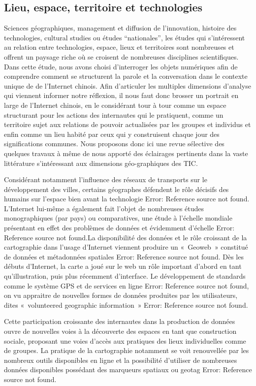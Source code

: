\subsection[Lieu, espace, territoire et technologies]{ Lieu, espace, territoire et technologies}
Sciences géographiques, management et diffusion de l’innovation, histoire des technologies, cultural studies ou études “nationales”, les études qui s’intéressent au relation entre technologies, espace, lieux et territoires sont nombreuses et offrent un paysage riche où se croisent de nombreuses disciplines scientifiques. Dans cette étude, nous avons choisi d’interroger les objets numériques afin de comprendre comment se structurent la parole et la conversation dans le contexte unique de de l’Internet chinois. Afin d’articuler les multiples dimensions d’analyse qui viennent informer notre réflexion, il nous faut donc brosser un portrait en large de l’Internet chinois, en le considérant tour à tour comme un espace structurant pour les actions des internautes qui le pratiquent, comme un territoire sujet aux relations de pouvoir actualisées par les groupes et individus et enfin comme un lieu habité par ceux qui y construisent chaque jour des significations communes. Nous proposons donc ici une revue sélective des quelques travaux à même de nous apporté des éclairages pertinents dans la vaste littérature s’intéressant aux dimensions géo-graphiques des TIC. 


Considérant notamment l’influence des réseaux de transports sur le développement des villes, certains géographes défendent le rôle décisifs des humains sur l’espace bien avant la technologie Error: Reference source not found. L’Internet lui-même a également fait l’objet de nombreuses études monographiques (par pays) ou comparatives, une étude à l’échelle mondiale présentant en effet des problèmes de données et évidemment d’échelle Error: Reference source not found.La disponibilité des données et le rôle croissant de la cartographie dans l’usage d’Internet viennent produire un « Geoweb » constitué de données et métadonnées spatiales Error: Reference source not found. Dès les débuts d’Internet, la carte a joué sur le web un rôle important d’abord en tant qu’illustration, puis plus récemment d’interface. Le développement de standards comme le système GPS et de services en ligne Error: Reference source not found, on vu appraitre de nouvelles formes de données produites par les utilisateurs, dites « volunteered geographic information » Error: Reference source not found. 

Cette participation croissante des internautes dans la production de données ouvre de nouvelles voies à la découverte des espaces en tant que construction sociale, proposant une voies d’accès aux pratiques des lieux individuelles comme de groupes. La pratique de la cartographie notamment se voit renouvellée par les nombreux outils disponibles en ligne et la possibilité d’utiliser de nombreuses données disponibles possédant des marqueurs spatiaux ou geotag Error: Reference source not found. 

